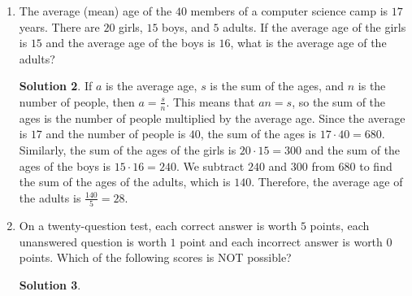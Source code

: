 \documentclass{article}
\theoremstyle{definition}
\newtheorem*{solution}{Solution}
\begin{document}
\begin{enumerate}
        by a fence. To make the garden larger, while using the same fence, its
        shape is changed to a square. By how many square feet does this enlarge
        the garden?
        \begin{solution}
            The perimeter of the rectangular garden is $2(60 + 20) = 160$ feet.
            A square with this perimeter has side length $\frac{160}{4} = 40$
            feet. The area of the rectangular garden is $60 \cdot 20 = 1200$
            square feet and the area of the square garden is $40^2 = 1600$
            square feet. Therefore the area increased by $1600 - 1200 = 400$
            square feet.
        \end{solution}
        \item The average (mean) age of the $40$ members of a computer science
        camp is $17$ years. There are $20$ girls, $15$ boys, and $5$ adults. If
        the average age of the girls is $15$ and the average age of the boys is
        $16$, what is the average age of the adults?
        \begin{solution}
            If $a$ is the average age, $s$ is the sum of the ages, and $n$ is
            the number of people, then $a = \frac{s}{n}$. This means that $an =
            s$, so the sum of the ages is the number of people multiplied by the
            average age. Since the average is $17$ and the number of people is
            $40$, the sum of the ages is $17 \cdot 40 = 680$. Similarly, the sum
            of the ages of the girls is $20 \cdot 15 = 300$ and the sum of the
            ages of the boys is $15 \cdot 16 = 240$. We subtract $240$ and $300$
            from $680$ to find the sum of the ages of the adults, which is
            $140$. Therefore, the average age of the adults is $\frac{140}{5} =
            28$.
        \end{solution}
        \item On a twenty-question test, each correct answer is worth $5$
        points, each unanswered question is worth $1$ point and each incorrect
        answer is worth $0$ points. Which of the following scores is NOT
        possible?
        \begin{solution}

\end{solution}
\end{enumerate}
\end{document}

